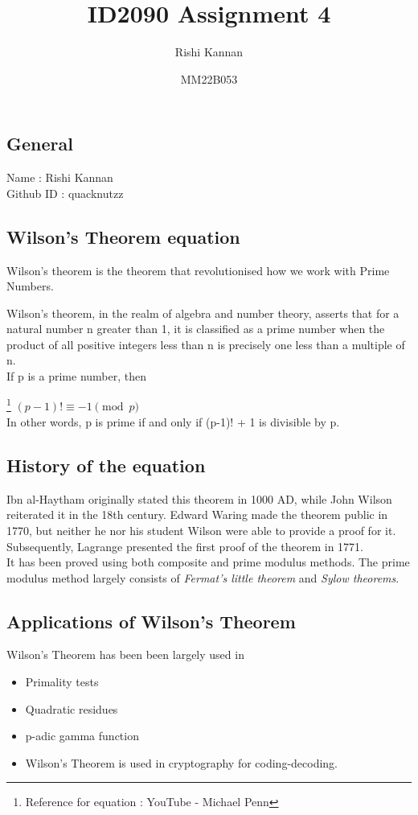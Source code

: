 \documentclass{article}
\title{ID2090 Assignment 4}
\author{Rishi Kannan }
\date{MM22B053}
\begin{document}
\maketitle

\section{}
\subsection{General}

Name : Rishi Kannan\\
Github ID : quacknutzz


\subsection{Wilson's Theorem equation}

\large Wilson's theorem is the theorem that revolutionised how we work with Prime Numbers. 

Wilson's theorem, in the realm of algebra and number theory, asserts that for a natural number n greater than 1, it is classified as a prime number when the product of all positive integers less than n is precisely one less than a multiple of n.\\
If p is a prime number, then

\footnote{Reference for equation : YouTube - Michael Penn}
\Large$(p-1)! \equiv -1\pmod{p}$\\ 
\large In other words, p is prime if and only if (p-1)! + 1 is divisible by p. 

\subsection{History of the equation}

\large Ibn al-Haytham originally stated this theorem in 1000 AD, while John Wilson reiterated it in the 18th century. Edward Waring made the theorem public in 1770, but neither he nor his student Wilson were able to provide a proof for it. Subsequently, Lagrange presented the first proof of the theorem in 1771.\\
It has been proved using both composite and prime modulus methods. The prime modulus method largely consists of \textit{Fermat's little theorem} and \textit{Sylow theorems}.

\subsection{Applications of Wilson's Theorem}

\large Wilson's Theorem has been been largely used in 
\begin{itemize}
  \item Primality tests
  \item Quadratic residues
  \item p-adic gamma function
  \item Wilson's Theorem is used in cryptography for coding-decoding.
\end{itemize}
\end{document}
